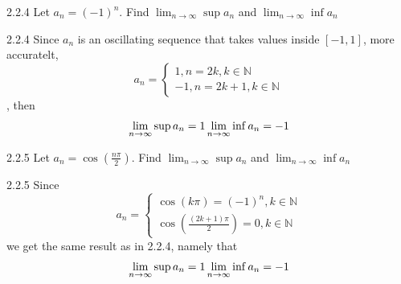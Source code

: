 \documentclass[a4paper,norsk]{article}
\begin{document}
\begin{oppgavebox}{2.2.4}{}
Let $ a_n = \left( -1 \right) ^n$. Find $ \lim_{n \to \infty} \sup a_n $ and $ \lim_{n \to \infty} \inf a_n $

\begin{proofbox}{2.2.4}{}
  Since $ a_n $ is an oscillating sequence that takes values inside $ \left[ -1, 1 \right]  $, more accuratelt, 
  \[
      a_n = \begin{cases}
      1, n = 2k, k \in \mathbb{N} \\
      -1, n = 2k+1, k \in \mathbb{N}
      \end{cases}
  \]
  , then
  \[
      \lim_{n \to \infty} \sup a_n = 1 \\
      \lim_{n \to \infty} \inf a_n = -1
  \]
  
\end{proofbox}
\end{oppgavebox}

\begin{oppgavebox}{2.2.5}{}
Let $ a_n = \cos( \frac{ n \pi  }{ 2 })   $. Find $ \lim_{n \to \infty} \sup a_n $ and $ \lim_{n \to \infty} \inf a_n $ 

\begin{proofbox}{2.2.5}{}
  Since 
  \[
      a_n = \begin{cases}
        \cos(k \pi ) = \left( -1 \right) ^n, k \in \mathbb{N} \\
        \cos( \frac{ \left( 2k+1 \right) \pi  }{ 2 })   = 0, k \in \mathbb{N}
      \end{cases}
  \]
  we get the same result as in 2.2.4, namely that
  \[
      \lim_{n \to \infty} \sup a_n = 1 \\
      \lim_{n \to \infty} \inf a_n = -1
  \]

   
\end{proofbox}
\end{oppgavebox}
\end{document}
